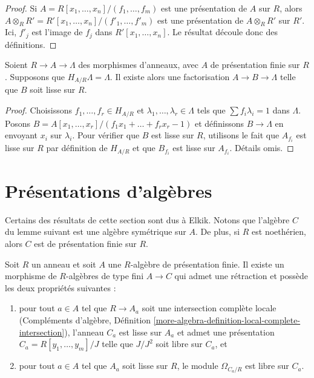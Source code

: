 \begin{proof}
Si $A = R[x_1, \ldots, x_n]/(f_1, \ldots, f_m)$ est une présentation de $A$
sur $R$, alors
$A \otimes_R R' = R'[x_1, \ldots, x_n]/(f'_1, \ldots, f'_m)$
est une présentation de $A \otimes_R R'$ sur $R'$. Ici, $f'_j$ est l'image de
$f_j$ dans $R'[x_1, \ldots, x_n]$. Le résultat découle donc des définitions.
\end{proof}

\begin{lemma}
\label{lemma-final-solve}
Soient $R \to A \to \Lambda$ des morphismes d'anneaux, avec $A$ de présentation
finie sur $R$. Supposons que $H_{A/R} \Lambda = \Lambda$. Il existe alors une
factorisation $A \to B \to \Lambda$ telle que $B$ soit lisse sur $R$.
\end{lemma}

\begin{proof}
Choisissons $f_1, \ldots, f_r \in H_{A/R}$ et
$\lambda_1, \ldots, \lambda_r \in \Lambda$ tels que
$\sum f_i\lambda_i = 1$ dans $\Lambda$. Posons
$B = A[x_1, \ldots, x_r]/(f_1x_1 + \ldots + f_rx_r - 1)$
et définissons $B \to \Lambda$ en envoyant $x_i$ sur $\lambda_i$.
Pour vérifier que $B$ est lisse sur $R$, utilisons le fait que $A_{f_i}$ est
lisse sur $R$ par définition de $H_{A/R}$ et que $B_{f_i}$ est lisse sur
$A_{f_i}$. Détails omis.
\end{proof}





\section{Présentations d'algèbres}
\label{section-presentations}

\noindent
Certains des résultats de cette section sont dus à Elkik. Notons que l'algèbre
$C$ du lemme suivant est une algèbre symétrique sur $A$. De plus, si $R$ est
noethérien, alors $C$ est de présentation finie sur $R$.

\begin{lemma}
\label{lemma-improve-presentation}
Soit $R$ un anneau et soit $A$ une $R$-algèbre de présentation finie.
Il existe un morphisme de $R$-algèbres de type fini $A \to C$ qui admet une
rétraction et possède les deux propriétés suivantes :
\begin{enumerate}
\item pour tout $a \in A$ tel que $R \to A_a$ soit une intersection complète
locale (Compléments d'algèbre, Définition
\ref{more-algebra-definition-local-complete-intersection}),
l'anneau $C_a$ est lisse sur $A_a$ et admet une présentation
$C_a = R[y_1, \ldots, y_m]/J$ telle que $J/J^2$ soit libre sur $C_a$, et
\item pour tout $a \in A$ tel que $A_a$ soit lisse sur $R$, le module
$\Omega_{C_a/R}$ est libre sur $C_a$.
\end{enumerate}
\end{lemma}


